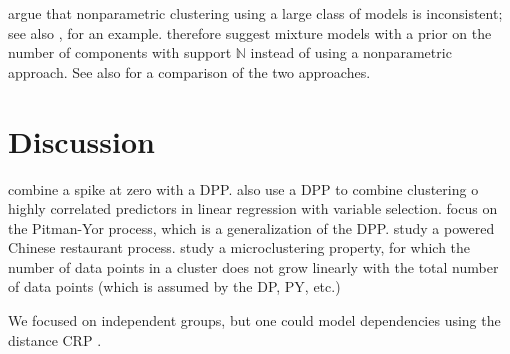 \documentclass[11pt,a4paper]{article}
\theoremstyle{definition} %
\theoremstyle{case}
\begin{document}
\textcite{miller2014inconsistency} argue that nonparametric clustering using a large class of models is inconsistent; see also \textcite{miller2013simple}, for an example. \textcite{miller2018mixture} therefore suggest mixture models with a prior on the number of components with support $\mathbb{N}$ instead of using a nonparametric approach. See also \textcite{green2001modelling} for a comparison of the two approaches.

\section{Discussion}
\textcite{kim2009spiked} combine a spike at zero with a DPP. \textcite{curtis2011bayesian} also use a DPP to combine clustering o highly correlated predictors in linear regression with variable selection. \textcite{canale2017pitman} focus on the Pitman-Yor process, which is a generalization of the DPP. \textcite{lu2018reducing} study a powered Chinese restaurant process. \textcite{miller2015microclustering} study a microclustering property, for which the number of data points in a cluster does not grow linearly with the total number of data points (which is assumed by the DP, PY, etc.)

We focused on independent groups, but one could model dependencies using the distance CRP \parencite{blei2011distance}.


\printbibliography
\end{document}
